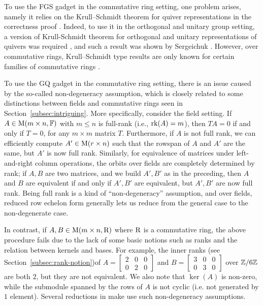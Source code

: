 To use the FGS gadget in the commutative ring setting, one problem arises, namely it relies on the Krull--Schmidt theorem for quiver representations in the correctness proof \cite{FGS19}. Indeed, to use it in the orthogonal and unitary group setting, a version of Krull-Schmidt theorem for orthogonal and unitary representations of quivers was required \cite{TI3}, and such a result was shown by Sergeichuk \cite{Ser98}. However, over commutative rings, Krull--Schmidt type results are only known for certain families of commutative rings \cite{Krull-Schmidt}.

To use the GQ gadget in the commutative ring setting, there is an issue caused by the so-called non-degeneracy assumption, which is closely related to some distinctions between fields and commutative rings seen in Section~\ref{subsec:intriguing}. 
More specifically, consider the field setting. If $A \in \mathrm{M}(m \times n, \mathbb{F})$ with $m \leq n$ is full-rank (i.e., $\mathrm{rk}(A) = m$), then $TA = 0$ if and only if $T =0$, for any $m \times m$ matrix $T$. Furthermore, if $A$ is not full rank, we can efficiently compute $A' \in \mathrm{M}(r \times n)$ such that the rowspan of $A$ and $A'$ are the same, but $A'$ is now full rank. Similarly, for equivalence of matrices under left-and-right column operations, the orbits over fields are completely determined by rank; if $A,B$ are two matrices, and we build $A',B'$ as in the preceding, then $A$ and $B$ are equivalent if and only if $A',B'$ are equivalent, but $A',B'$ are now full rank. Being full rank is a kind of ``non-degeneracy'' assumption, and over fields, reduced row echelon form generally lets us reduce from the general case to the non-degenerate case. 

In contrast, if $A, B\in \mathrm{M}(m\times n, \mathrm{R})$ where $\mathrm{R}$ is a commutative ring, the above procedure fails due to the lack of some basic notions such as ranks and the relation between kernels and bases. For example, the inner ranks (see Section~\ref{subsec:rank-notion})of $A=\begin{bmatrix}
	2 & 0 & 0 \\
	0 & 2 & 0 
\end{bmatrix}$ and $B=\begin{bmatrix}
	3 & 0 & 0 \\
	0 & 3 & 0
\end{bmatrix}$ over $\mathbb{Z}/6\mathbb{Z}$ are both $2$, but they are not equivalent. We also note that $\ker(A)$ is non-zero, while the submodule spanned by the rows of $A$ is not cyclic (i.e. not generated by $1$ element). Several reductions in \cite{TI1,GQT} make use such non-degeneracy assumptions. 

